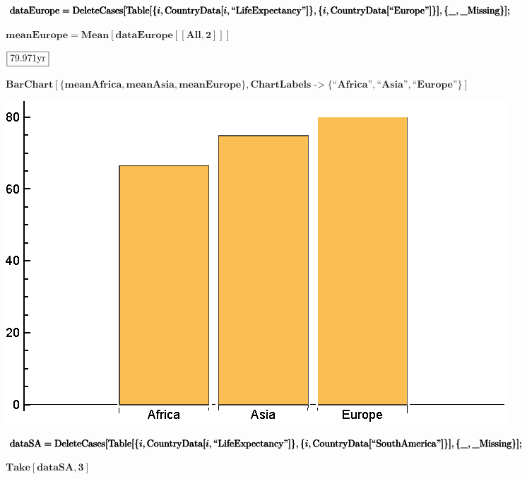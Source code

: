 \documentclass{article}
\begin{document}
\begin{doublespace}
\noindent\(\pmb{\text{dataEurope}=\text{DeleteCases}[}\\
\pmb{\text{Table}[\{i,\text{CountryData}[i,\text{{``}LifeExpectancy{''}}]\},\{i,\text{CountryData}[\text{{``}Europe{''}}]\}],\{\_,\text{$\_$Missing}\}];}\)
\end{doublespace}

\begin{doublespace}
\noindent\(\pmb{\text{meanEurope} = \text{Mean}[\text{dataEurope}[[\text{All},2]]]}\)
\end{doublespace}

\begin{doublespace}
\noindent\(\fbox{$79.971\text{yr}$}\)
\end{doublespace}

\begin{doublespace}
\noindent\(\pmb{\text{BarChart}[\{\text{meanAfrica},\text{meanAsia},\text{meanEurope}\},\text{ChartLabels}\text{-$>$}\{\text{{``}Africa{''}},\text{{``}Asia{''}},\text{{``}Europe{''}}\}]}\)
\end{doublespace}

\includegraphics{WLG_gr2.eps}

\begin{doublespace}
\noindent\(\pmb{\text{dataSA}=\text{DeleteCases}[}\\
\pmb{\text{Table}[\{i,\text{CountryData}[i,\text{{``}LifeExpectancy{''}}]\},\{i,\text{CountryData}[\text{{``}SouthAmerica{''}}]\}],\{\_,\text{$\_$Missing}\}];}\)
\end{doublespace}

\begin{doublespace}
\noindent\(\pmb{\text{Take}[\text{dataSA},3]}\)
\end{doublespace}
\end{document}
